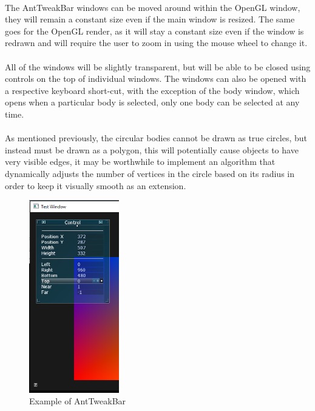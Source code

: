 \paragraph{}
The AntTweakBar windows can be moved around within the OpenGL window, they will remain a constant size even if the main window is resized. The same goes for the OpenGL render, as it will stay a constant size even if the window is redrawn and will require the user to zoom in using the mouse wheel to change it.

\paragraph{}
All of the windows will be slightly transparent, but will be able to be closed using controls on the top of individual windows. The windows can also be opened with a respective keyboard short-cut, with the exception of the body window, which opens when a particular body is selected, only one body can be selected at any time.

\paragraph{}
As mentioned previously, the circular bodies cannot be drawn as true circles, but instead must be drawn as a polygon, this will potentially cause objects to have very visible edges, it may be worthwhile to implement an algorithm that dynamically adjusts the number of vertices in the circle based on its radius in order to keep it visually smooth as an extension.

\begin{figure}
  \centering
  \includegraphics[width=0.35\textwidth]{img/atb.PNG}
  \caption{Example of AntTweakBar}
  \vspace{-50pt}
\end{figure}

